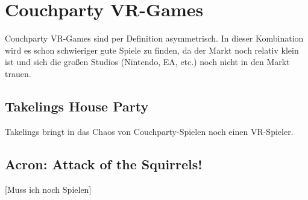 \section{Couchparty VR-Games}

Couchparty VR-Games sind per Definition asymmetrisch. In dieser Kombination wird es schon schwieriger gute Spiele zu finden, da der Markt noch relativ klein ist und sich die großen Studios (Nintendo, EA, etc.) noch nicht in den Markt trauen.

\subsection{Takelings House Party}

Takelings bringt in das Chaos von Couchparty-Spielen noch einen VR-Spieler.

\subsection{Acron: Attack of the Squirrels!}
[Muss ich noch Spielen]